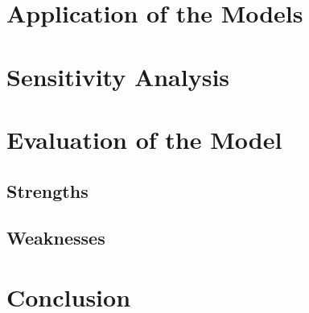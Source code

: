 \documentclass{HZNUMCM}
\begin{document}
  \section{Application of the Models}

  \section{Sensitivity Analysis}

  \section{Evaluation of the Model}
    \subsection{Strengths}
    \subsection{Weaknesses}

  \section{Conclusion}



\end{document}
